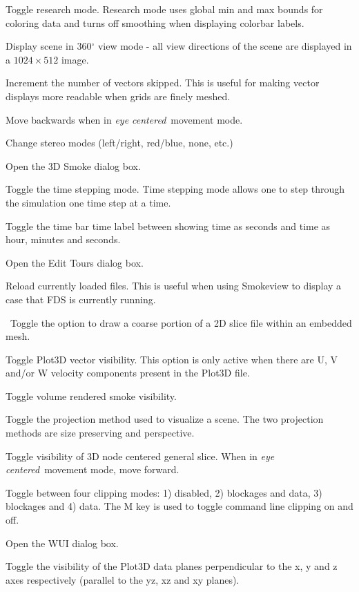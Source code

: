 \documentclass[11pt,twoside]{book}
\newcommand{\kitem}[1]{\item[{\bf {\tt #1 \  }} \hfill]}
\begin{document}
\kitem{ALT r}Toggle research mode.  Research mode uses global min
and max bounds for coloring data and turns off smoothing when displaying colorbar labels.

\kitem{ALT R}Display scene in 360$^\circ$ view mode - all view directions of the scene are displayed in a $1024\times 512$ image.

\kitem{s}Increment the number of vectors skipped. This is useful
for making vector displays more readable when grids are finely
meshed.

\kitem{s}Move backwards when in {\em eye centered}\ movement mode.

\kitem{S}Change stereo modes (left/right, red/blue, none, etc.)

\kitem{ALT s}Open the 3D Smoke dialog box.

\kitem{t}Toggle the time stepping mode.  Time stepping mode allows
one to step through the simulation one time step at a time.

\kitem{T}Toggle the time bar time label between showing time as seconds
and time as hour, minutes and seconds.

\kitem{ALT t}Open the Edit Tours dialog box.

\kitem{u,U}Reload currently loaded files.  This is useful when
using Smokeview to display a case that FDS is currently running.

\kitem{ALT u}\ Toggle the option to draw a coarse portion of a 2D
slice file within an embedded mesh.

\kitem{v}Toggle Plot3D vector visibility.  This option is only active
when there are U, V and/or W velocity components present in the
Plot3D file.

\kitem{V}Toggle volume rendered smoke visibility.

\kitem{ALT v}Toggle the projection method used to visualize a
scene. The two projection methods are size preserving and
perspective.

\kitem{w}Toggle visibility of 3D node centered general slice.
When in {\em eye centered}\ movement
mode, move forward.

\kitem{W}Toggle between four clipping modes: 1) disabled, 2) blockages and data, 3) blockages and 4) data. The M key is used to toggle command line clipping on and off.

\kitem{ALT w}Open the WUI dialog box.

\kitem{x,X y,Y, z,Z}Toggle the visibility of the Plot3D data
planes perpendicular to the x, y and z axes respectively (parallel
to the yz, xz and xy planes).
\end{document}
